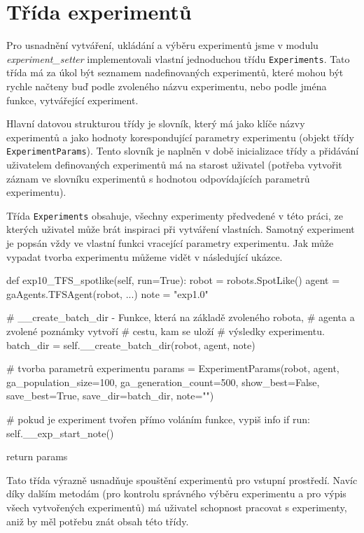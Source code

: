 \section{Třída experimentů} \label{imp:experimentsetter}
Pro usnadnění vytváření, ukládání a výběru experimentů jsme v modulu
\emph{experiment\_setter} implementovali vlastní jednoduchou třídu
\texttt{Experiments}. Tato třída má za úkol být seznamem nadefinovaných
experimentů, které mohou být rychle načteny buď podle zvoleného názvu
experimentu, nebo podle jména funkce, vytvářející experiment.

Hlavní datovou strukturou třídy je slovník, který má jako klíče názvy
experimentů a jako hodnoty korespondující parametry experimentu (objekt
třídy \texttt{ExperimentParams}). Tento slovník je naplněn v době inicializace
třídy a přidávání uživatelem definovaných experimentů má na starost uživatel
(potřeba vytvořit záznam ve slovníku experimentů s hodnotou odpovídajících
parametrů experimentu).

Třída \texttt{Experiments} obsahuje, všechny experimenty předvedené v této
práci, ze kterých uživatel může brát inspiraci při vytváření vlastních. Samotný
experiment je popsán vždy ve vlastní funkci vracející parametry experimentu.
Jak může vypadat tvorba experimentu můžeme vidět v následující ukázce.

\begin{code}
def exp10_TFS_spotlike(self, run=True):
    robot = robots.SpotLike()
    agent = gaAgents.TFSAgent(robot, ...)
    note = "exp1.0"

    # __create_batch_dir - Funkce, která na základě zvoleného robota, 
    # agenta a zvolené poznámky vytvoří # cestu, kam se uloží 
    # výsledky experimentu.
    batch_dir = self.__create_batch_dir(robot, agent, note) 

    # tvorba parametrů experimentu
    params = ExperimentParams(robot, 
                              agent,
                              ga_population_size=100,
                              ga_generation_count=500,
                              show_best=False,
                              save_best=True,
                              save_dir=batch_dir,
                              note="")

    # pokud je experiment tvořen přímo voláním funkce, vypiš info
    if run: 
        self.__exp_start_note()

    return params
\end{code}

Tato třída výrazně usnadňuje spouštění experimentů pro vstupní prostředí. Navíc
díky dalším metodám (pro kontrolu správného výběru experimentu a pro výpis
všech vytvořených experimentů) má uživatel schopnost pracovat s experimenty,
aniž by měl potřebu znát obsah této třídy.

